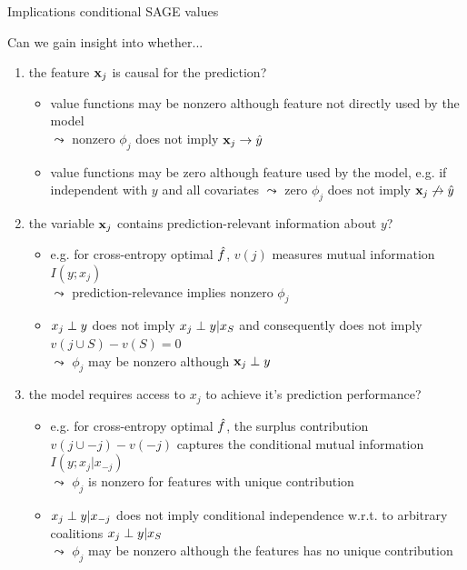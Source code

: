 \documentclass[11pt,compress,t,notes=noshow, aspectratio=169, xcolor=table]{beamer}
\begin{document}
\begin{frame}{Implications conditional SAGE values}

Can we gain insight into whether...

\begin{enumerate}
    \item<1-> the feature $\xj$ is causal for the prediction?
    \begin{itemize}
      \item value functions may be nonzero although feature not directly used by the model\\
      $\leadsto$ nonzero $\phi_j$ does not imply $\xj \rightarrow \hat{y}$
      \item value functions may be zero although feature used by the model, e.g. if independent with $y$ and all covariates $\leadsto$ zero $\phi_j$ does not imply $\xj \not \rightarrow \hat{y}$
    \end{itemize}
    \item<2-> the variable $\xj$ contains prediction-relevant information about $y$?
    \begin{itemize}
      \item e.g. for cross-entropy optimal $\fh$, $v(j)$ measures mutual information $I(y;x_j)$\\
      $\leadsto$ prediction-relevance implies nonzero $\phi_j$
      \item $x_j \indep y$ does not imply $x_j \indep y | x_S$ and consequently does not imply $v(j \cup S) - v(S) = 0$\\
      $\leadsto$ $\phi_j$ may be nonzero although $\xj \indep y$
    \end{itemize}
    \item<3-> the model requires access to $x_j$ to achieve it's prediction performance?  
    \begin{itemize}
        \item e.g. for cross-entropy optimal $\fh$, the surplus contribution $v(j \cup -j) - v(-j)$ captures the conditional mutual information $I(y;x_j|x_{-j})$\\
        $\leadsto$ $\phi_j$ is nonzero for features with unique contribution
        \item $x_j \indep y | x_{-j}$ does not imply conditional independence w.r.t. to arbitrary coalitions $x_j \indep y | x_S$\\
        $\leadsto$ $\phi_j$ may be nonzero although the features has no unique contribution
    \end{itemize}
\end{enumerate}

\end{frame}
\end{document}
